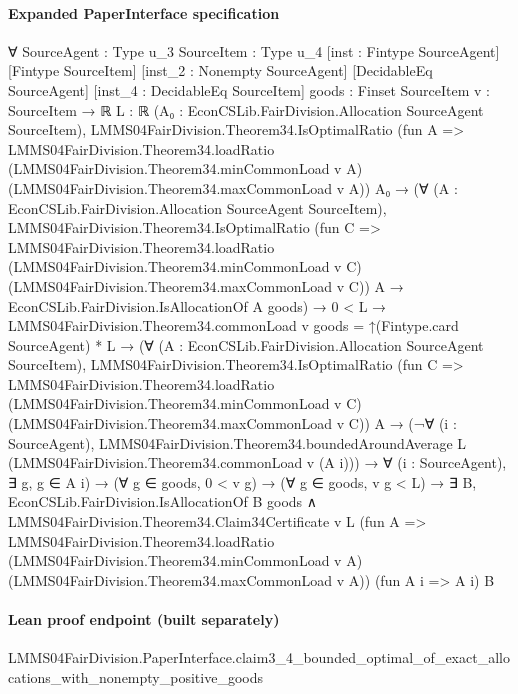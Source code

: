 \documentclass[10pt]{article}
\begin{document}
\paragraph{Expanded PaperInterface specification}
\begin{ReviewVerbatim}
∀ {SourceAgent : Type u_3} {SourceItem : Type u_4} [inst : Fintype SourceAgent] [Fintype SourceItem]
  [inst_2 : Nonempty SourceAgent] [DecidableEq SourceAgent] [inst_4 : DecidableEq SourceItem]
  {goods : Finset SourceItem} {v : SourceItem → ℝ} {L : ℝ}
  (A₀ : EconCSLib.FairDivision.Allocation SourceAgent SourceItem),
  LMMS04FairDivision.Theorem34.IsOptimalRatio
      (fun A =>
        LMMS04FairDivision.Theorem34.loadRatio (LMMS04FairDivision.Theorem34.minCommonLoad v A)
          (LMMS04FairDivision.Theorem34.maxCommonLoad v A))
      A₀ →
    (∀ (A : EconCSLib.FairDivision.Allocation SourceAgent SourceItem),
        LMMS04FairDivision.Theorem34.IsOptimalRatio
            (fun C =>
              LMMS04FairDivision.Theorem34.loadRatio (LMMS04FairDivision.Theorem34.minCommonLoad v C)
                (LMMS04FairDivision.Theorem34.maxCommonLoad v C))
            A →
          EconCSLib.FairDivision.IsAllocationOf A goods) →
      0 < L →
        LMMS04FairDivision.Theorem34.commonLoad v goods = ↑(Fintype.card SourceAgent) * L →
          (∀ (A : EconCSLib.FairDivision.Allocation SourceAgent SourceItem),
              LMMS04FairDivision.Theorem34.IsOptimalRatio
                  (fun C =>
                    LMMS04FairDivision.Theorem34.loadRatio (LMMS04FairDivision.Theorem34.minCommonLoad v C)
                      (LMMS04FairDivision.Theorem34.maxCommonLoad v C))
                  A →
                (¬∀ (i : SourceAgent),
                      LMMS04FairDivision.Theorem34.boundedAroundAverage L
                        (LMMS04FairDivision.Theorem34.commonLoad v (A i))) →
                  ∀ (i : SourceAgent), ∃ g, g ∈ A i) →
            (∀ g ∈ goods, 0 < v g) →
              (∀ g ∈ goods, v g < L) →
                ∃ B,
                  EconCSLib.FairDivision.IsAllocationOf B goods ∧
                    LMMS04FairDivision.Theorem34.Claim34Certificate v L
                      (fun A =>
                        LMMS04FairDivision.Theorem34.loadRatio (LMMS04FairDivision.Theorem34.minCommonLoad v A)
                          (LMMS04FairDivision.Theorem34.maxCommonLoad v A))
                      (fun A i => A i) B
\end{ReviewVerbatim}

\paragraph{Lean proof endpoint (built separately)}\begin{ReviewVerbatim}
LMMS04FairDivision.PaperInterface.claim3_4_bounded_optimal_of_exact_allocations_with_nonempty_positive_goods
\end{ReviewVerbatim}
\end{document}
